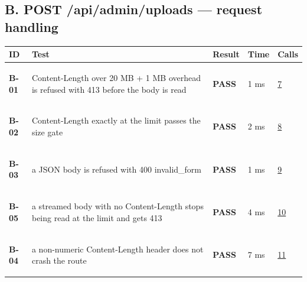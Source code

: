 \documentclass[10pt,a4paper]{article}
\begin{document}
\subsection*{B. POST /api/admin/uploads — request handling}
\begin{longtable}{@{}P{1.2cm}P{9.2cm}P{1.2cm}P{1.3cm}P{2.4cm}@{}}
\toprule \textbf{ID} & \textbf{Test} & \textbf{Result} & \textbf{Time} & \textbf{Calls} \\ \midrule \endhead
\hypertarget{test-B-01}{\textbf{B-01}} & Content-Length over 20 MB + 1 MB overhead is refused with 413 before the body is read & \textcolor{passgreen}{\textbf{PASS}} & 1 ms & \hyperlink{call7}{7} \\
\hypertarget{test-B-02}{\textbf{B-02}} & Content-Length exactly at the limit passes the size gate & \textcolor{passgreen}{\textbf{PASS}} & 2 ms & \hyperlink{call8}{8} \\
\hypertarget{test-B-03}{\textbf{B-03}} & a JSON body is refused with 400 invalid\_form & \textcolor{passgreen}{\textbf{PASS}} & 1 ms & \hyperlink{call9}{9} \\
\hypertarget{test-B-05}{\textbf{B-05}} & a streamed body with no Content-Length stops being read at the limit and gets 413 & \textcolor{passgreen}{\textbf{PASS}} & 4 ms & \hyperlink{call10}{10} \\
\hypertarget{test-B-04}{\textbf{B-04}} & a non-numeric Content-Length header does not crash the route & \textcolor{passgreen}{\textbf{PASS}} & 7 ms & \hyperlink{call11}{11} \\
\bottomrule
\end{longtable}
\end{document}
